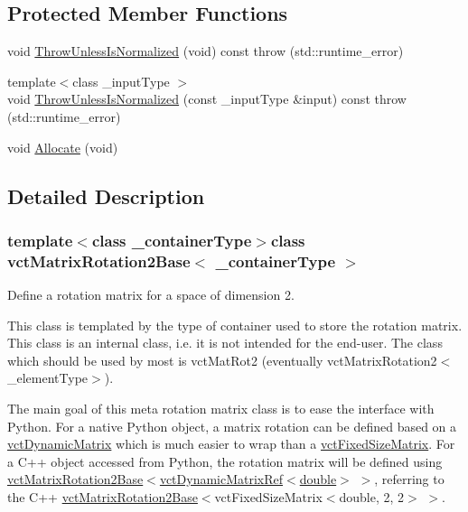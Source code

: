 \subsection*{Protected Member Functions}
\begin{DoxyCompactItemize}
\item 
void \hyperlink{classvct_matrix_rotation2_base_a4545e2e435212f5e180b06b28d4f9f28}{Throw\-Unless\-Is\-Normalized} (void) const   throw (std\-::runtime\-\_\-error)
\item 
{\footnotesize template$<$class \-\_\-input\-Type $>$ }\\void \hyperlink{classvct_matrix_rotation2_base_a3677991b6dc883d5396ca22766eb8c2b}{Throw\-Unless\-Is\-Normalized} (const \-\_\-input\-Type \&input) const   throw (std\-::runtime\-\_\-error)
\item 
void \hyperlink{classvct_matrix_rotation2_base_afa9b55061c3932d739117db85d0270be}{Allocate} (void)
\end{DoxyCompactItemize}


\subsection{Detailed Description}
\subsubsection*{template$<$class \-\_\-container\-Type$>$class vct\-Matrix\-Rotation2\-Base$<$ \-\_\-container\-Type $>$}

Define a rotation matrix for a space of dimension 2. 

This class is templated by the type of container used to store the rotation matrix. This class is an internal class, i.\-e. it is not intended for the end-\/user. The class which should be used by most is vct\-Mat\-Rot2 (eventually vct\-Matrix\-Rotation2$<$\-\_\-element\-Type$>$).

The main goal of this meta rotation matrix class is to ease the interface with Python. For a native Python object, a matrix rotation can be defined based on a \hyperlink{classvct_dynamic_matrix}{vct\-Dynamic\-Matrix} which is much easier to wrap than a \hyperlink{classvct_fixed_size_matrix}{vct\-Fixed\-Size\-Matrix}. For a C++ object accessed from Python, the rotation matrix will be defined using \hyperlink{classvct_matrix_rotation2_base}{vct\-Matrix\-Rotation2\-Base}$<$\hyperlink{classvct_dynamic_matrix_ref}{vct\-Dynamic\-Matrix\-Ref$<$double$>$} $>$, referring to the C++ \hyperlink{classvct_matrix_rotation2_base}{vct\-Matrix\-Rotation2\-Base}$<$vct\-Fixed\-Size\-Matrix$<$double, 2, 2$>$ $>$.



